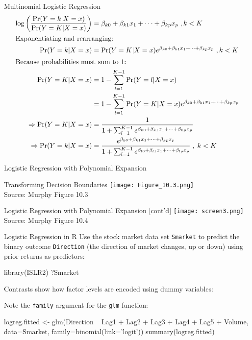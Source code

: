 \documentclass[ignorenonframetext,xcolor=x11names]{beamer}
\begin{document}
\begin{frame}{Multinomial Logistic Regression}
\small
\begin{align*}
\log \left( \frac{\Pr(Y=k | X=x)}{\Pr(Y=K | X=x)}\right) &= \beta_{k0}+\beta_{k1}x_1 + \cdots + \beta_{kp}x_p \; , k<K \\
\intertext{Exponentiating and rearranging:}
\Pr(Y=k | X=x) &= \Pr(Y=K | X=x) e^{\beta_{k0}+\beta_{k1}x_1 + \cdots + \beta_{kp}x_p} \;, k<K\\
\intertext{Because probabilities must sum to 1:}
\Pr(Y=K | X=x) &= 1 - \sum_{l=1}^{K-1} \Pr(Y=l | X=x) \\
&= 1 - \sum_{l=1}^{K-1} \Pr(Y=K | X=x) e^{\beta_{k0}+\beta_{k1}x_1 + \cdots + \beta_{kp}x_p} \\
\Rightarrow \Pr(Y=K | X = x) &= \frac{1}{1 + \sum_{l=1}^{K-1} e^{\beta_{k0}+\beta_{k1}x_1 + \cdots + \beta_{kp}x_p}} \\
\Rightarrow \Pr(Y=k|X=x) &= \frac{e^{\beta_{k0}+\beta_{k1}x_1 + \cdots + \beta_{kp}x_p}}{1 + \sum_{l=1}^{K-1} e^{\beta_{l0}+\beta_{l1}x_1 + \cdots + \beta_{lp}x_p}} \;, \; k < K
\end{align*}
\end{frame}

\begin{frame}{Logistic Regression with Polynomial Expansion}
\begin{block}{Transforming Decision Boundaries}
\texttt{[image: Figure\_10.3.png]} \\
\scriptsize Source: Murphy Figure 10.3
\end{block}
\end{frame}

\begin{frame}{Logistic Regression with Polynomial Expansion \small [cont'd]}
\centering
\texttt{[image: screen3.png]} \\
\scriptsize Source: Murphy Figure 10.4
\end{frame}

\begin{frame}[fragile]{Logistic Regression in R}
\small
Use the stock market data set \texttt{Smarket} to predict the binary outcome \texttt{Direction} (the direction of market changes, up or down) using prior returns as predictors:
\begin{Rcode}
library(ISLR2)
?Smarket
\end{Rcode}
Contrasts show how factor levels are encoded using dummy variables:
Note the \texttt{family} argument for the \texttt{glm} function:
\begin{Rcode}
logreg.fitted <- 
   glm(Direction ~ Lag1 + Lag2 + Lag3 + Lag4 + Lag5 + Volume, 
       data=Smarket, 
       family=binomial(link='logit'))
summary(logreg.fitted)
\end{Rcode}
\end{frame}
\end{document}
